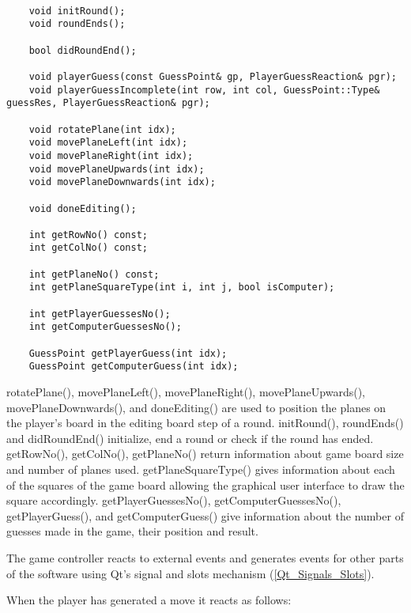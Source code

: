 \begin{lstlisting}

	void initRound();
	void roundEnds();
	
	bool didRoundEnd();
	
	void playerGuess(const GuessPoint& gp, PlayerGuessReaction& pgr);
	void playerGuessIncomplete(int row, int col, GuessPoint::Type& guessRes, PlayerGuessReaction& pgr);
	
	void rotatePlane(int idx);
	void movePlaneLeft(int idx);
	void movePlaneRight(int idx);
	void movePlaneUpwards(int idx);
	void movePlaneDownwards(int idx);
	
	void doneEditing();
	
	int getRowNo() const;
	int getColNo() const;
	
	int getPlaneNo() const;
	int getPlaneSquareType(int i, int j, bool isComputer);
	
	int getPlayerGuessesNo();
	int getComputerGuessesNo();
	
	GuessPoint getPlayerGuess(int idx);
	GuessPoint getComputerGuess(int idx);

\end{lstlisting}

rotatePlane(), movePlaneLeft(), movePlaneRight(), movePlaneUpwards(), movePlaneDownwards(), and doneEditing() are used to position the planes on the player's board in the editing board step of a round. initRound(), roundEnds() and didRoundEnd() initialize, end a round or check if the round has ended. getRowNo(), getColNo(), getPlaneNo() return information about game board size and number of planes used. getPlaneSquareType() gives information about each of the squares of the game board allowing the graphical user interface to draw the square accordingly. getPlayerGuessesNo(), getComputerGuessesNo(), getPlayerGuess(), and getComputerGuess() give information about the number of guesses made in the game, their position and result.


The game controller reacts to external events and generates events for other parts of the software using Qt's signal and slots mechanism (\ref{Qt_Signals_Slots}). 

When the player has generated a move it reacts as follows:

